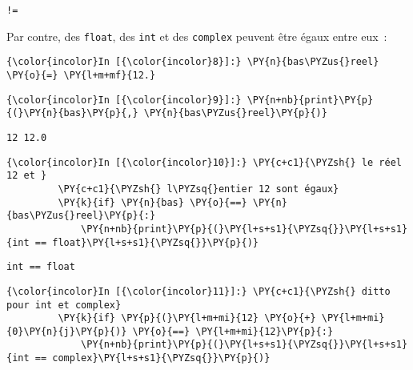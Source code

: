     \begin{Verbatim}[commandchars=\\\{\},frame=single,framerule=0.3mm,rulecolor=\color{cellframecolor}]
!=
\end{Verbatim}

    Par contre, des \texttt{float}, des \texttt{int} et des \texttt{complex}
peuvent être égaux entre eux~:

    \begin{Verbatim}[commandchars=\\\{\},frame=single,framerule=0.3mm,rulecolor=\color{cellframecolor}]
{\color{incolor}In [{\color{incolor}8}]:} \PY{n}{bas\PYZus{}reel} \PY{o}{=} \PY{l+m+mf}{12.}
\end{Verbatim}


    \begin{Verbatim}[commandchars=\\\{\},frame=single,framerule=0.3mm,rulecolor=\color{cellframecolor}]
{\color{incolor}In [{\color{incolor}9}]:} \PY{n+nb}{print}\PY{p}{(}\PY{n}{bas}\PY{p}{,} \PY{n}{bas\PYZus{}reel}\PY{p}{)}
\end{Verbatim}


    \begin{Verbatim}[commandchars=\\\{\},frame=single,framerule=0.3mm,rulecolor=\color{cellframecolor}]
12 12.0
\end{Verbatim}

    \begin{Verbatim}[commandchars=\\\{\},frame=single,framerule=0.3mm,rulecolor=\color{cellframecolor}]
{\color{incolor}In [{\color{incolor}10}]:} \PY{c+c1}{\PYZsh{} le réel 12 et }
         \PY{c+c1}{\PYZsh{} l\PYZsq{}entier 12 sont égaux}
         \PY{k}{if} \PY{n}{bas} \PY{o}{==} \PY{n}{bas\PYZus{}reel}\PY{p}{:}
             \PY{n+nb}{print}\PY{p}{(}\PY{l+s+s1}{\PYZsq{}}\PY{l+s+s1}{int == float}\PY{l+s+s1}{\PYZsq{}}\PY{p}{)}
\end{Verbatim}


    \begin{Verbatim}[commandchars=\\\{\},frame=single,framerule=0.3mm,rulecolor=\color{cellframecolor}]
int == float
\end{Verbatim}

    \begin{Verbatim}[commandchars=\\\{\},frame=single,framerule=0.3mm,rulecolor=\color{cellframecolor}]
{\color{incolor}In [{\color{incolor}11}]:} \PY{c+c1}{\PYZsh{} ditto pour int et complex}
         \PY{k}{if} \PY{p}{(}\PY{l+m+mi}{12} \PY{o}{+} \PY{l+m+mi}{0}\PY{n}{j}\PY{p}{)} \PY{o}{==} \PY{l+m+mi}{12}\PY{p}{:}
             \PY{n+nb}{print}\PY{p}{(}\PY{l+s+s1}{\PYZsq{}}\PY{l+s+s1}{int == complex}\PY{l+s+s1}{\PYZsq{}}\PY{p}{)}
\end{Verbatim}


